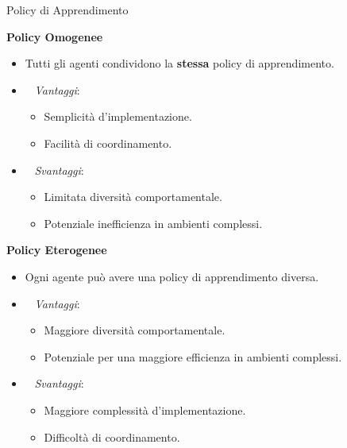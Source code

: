 \documentclass[presentation, 10pt,aspectratio=169]{beamer}\mode<presentation>{\usetheme{AMSBolognaFC}}
\begin{document}
\begin{frame}{Policy di Apprendimento}
	\begin{minipage}{0.45\textwidth}
		\centering
		\alert{\textbf{Policy Omogenee}}
		\begin{itemize}
			\item Tutti gli agenti condividono la \textbf{stessa} policy di apprendimento.
			\item {\color{green}\faThumbsUp} ~ \emph{Vantaggi}:
			\begin{itemize}
				\item Semplicità d'implementazione.
				\item Facilità di coordinamento.
			\end{itemize}
			\item {\color{red}\faThumbsDown} ~ \emph{Svantaggi}:
			\begin{itemize}
				\item Limitata diversità comportamentale.
				\item Potenziale inefficienza in ambienti complessi.
			\end{itemize}
		\end{itemize}
	\end{minipage}
	\hfill
	\begin{minipage}{0.45\textwidth}
		\centering
		\textbf{Policy Eterogenee}
		\begin{itemize}
			\item Ogni agente può avere una policy di apprendimento diversa.
			\item {\color{green}\faThumbsUp} ~ \emph{Vantaggi}:
			\begin{itemize}
				\item Maggiore diversità comportamentale.
				\item Potenziale per una maggiore efficienza in ambienti complessi.
			\end{itemize}
			\item {\color{red}\faThumbsDown} ~ \emph{Svantaggi}:
			\begin{itemize}
				\item Maggiore complessità d'implementazione.
				\item Difficoltà di coordinamento.
			\end{itemize}
		\end{itemize}
	\end{minipage}
\end{frame}
\end{document}
